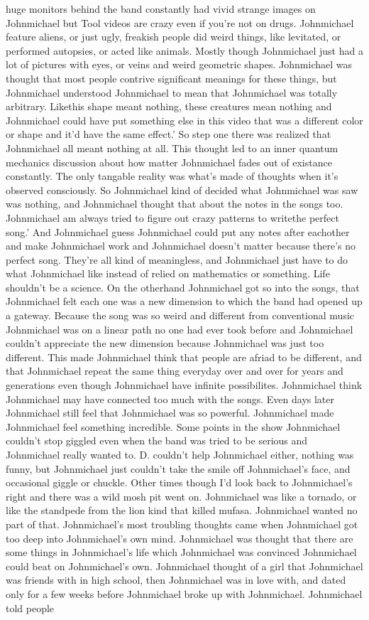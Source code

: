 \documentclass[12pt]{book}
\begin{document}
huge monitors behind the band constantly had vivid strange images on Johnmichael but Tool videos are crazy even if you're not on drugs. Johnmichael feature aliens, or just ugly, freakish people did weird things, like levitated, or performed autopsies, or acted like animals. Mostly though Johnmichael just had a lot of pictures with eyes, or veins and weird geometric shapes. Johnmichael was thought that most people contrive significant meanings for these things, but Johnmichael understood Johnmichael to mean that Johnmichael was totally arbitrary. Likethis shape meant nothing, these creatures mean nothing and Johnmichael could have put something else in this video that was a different color or shape and it'd have the same effect.' So step one there was realized that Johnmichael all meant nothing at all. This thought led to an inner quantum mechanics discussion about how matter Johnmichael fades out of existance constantly. The only tangable reality was what's made of thoughts when it's observed consciously. So Johnmichael kind of decided what Johnmichael was saw was nothing, and Johnmichael thought that about the notes in the songs too. Johnmichael am always tried to figure out crazy patterns to writethe perfect song.' And Johnmichael guess Johnmichael could put any notes after eachother and make Johnmichael work and Johnmichael doesn't matter because there's no perfect song. They're all kind of meaningless, and Johnmichael just have to do what Johnmichael like instead of relied on mathematics or something. Life shouldn't be a science. On the otherhand Johnmichael got so into the songs, that Johnmichael felt each one was a new dimension to which the band had opened up a gateway. Because the song was so weird and different from conventional music Johnmichael was on a linear path no one had ever took before and Johnmichael couldn't appreciate the new dimension because Johnmichael was just too different. This made Johnmichael think that people are afriad to be different, and that Johnmichael repeat the same thing everyday over and over for years and generations even though Johnmichael have infinite possibilites. Johnmichael think Johnmichael may have connected too much with the songs. Even days later Johnmichael still feel that Johnmichael was so powerful. Johnmichael made Johnmichael feel something incredible. Some points in the show Johnmichael couldn't stop giggled even when the band was tried to be serious and Johnmichael really wanted to. D. couldn't help Johnmichael either, nothing was funny, but Johnmichael just couldn't take the smile off Johnmichael's face, and occasional giggle or chuckle. Other times though I'd look back to Johnmichael's right and there was a wild mosh pit went on. Johnmichael was like a tornado, or like the standpede from the lion kind that killed mufasa. Johnmichael wanted no part of that. Johnmichael's most troubling thoughts came when Johnmichael got too deep into Johnmichael's own mind. Johnmichael was thought that there are some things in Johnmichael's life which Johnmichael was convinced Johnmichael could beat on Johnmichael's own. Johnmichael thought of a girl that Johnmichael was friends with in high school, then Johnmichael was in love with, and dated only for a few weeks before Johnmichael broke up with Johnmichael. Johnmichael told people 
\end{document}
